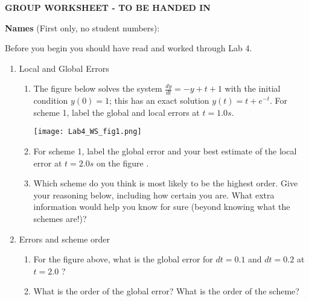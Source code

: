 \documentclass[12pt]{article}
\begin{document}
{\bf GROUP WORKSHEET - TO BE HANDED IN}

{\bf Names} (First only, no student numbers):\\
\vspace{0.5in}

Before you begin you should have read and worked through Lab 4.


\begin{enumerate}
\item Local and Global Errors
\begin{enumerate}
\item The figure below solves the system $\frac{dy}{dt} = -y + t + 1$ with the initial condition $y(0) = 1$; this has an exact solution $y(t) = t + e^{-t}$. For scheme 1, label the global and local errors at $t = 1.0s$.
\begin{center}
\texttt{[image: Lab4\_WS\_fig1.png]}
\end{center}
\vspace{0.25in}
\item For scheme 1, label the global error and your best estimate of the local error at $t = 2.0s$ on the figure .
\vspace{0.25in}

\item Which scheme do you think is most likely to be the highest order. Give your reasoning below, including how certain you are. What extra information would help you know for sure (beyond knowing what the schemes are!)?
\vspace{2in}
\end{enumerate}
\item Errors and scheme order
\begin{enumerate}
\begin{center}
\texttt{[image: Lab4\_WS\_fig2.png]}
\end{center}
\item For the figure above, what is the global error for $dt = 0.1$ and $dt = 0.2$ at $t=2.0$ ?
\vspace{0.4in}
\item What is the order of the global error? What is the order of the scheme?
\vspace{0.4in}
\end{enumerate}


\end{enumerate}
\end{document}
